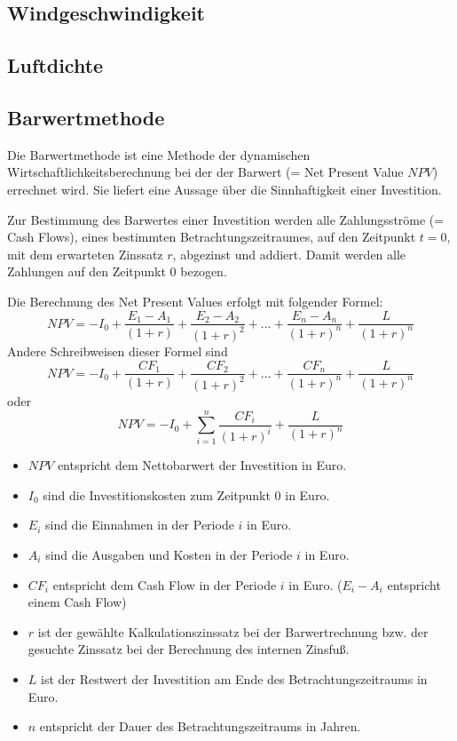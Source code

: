 \documentclass[a4paper,12pt]{article}
\begin{document}
	\subsection{Windgeschwindigkeit}
	\subsection{Luftdichte}
	\subsection{Barwertmethode}
	Die Barwertmethode ist eine Methode der dynamischen Wirtschaftlichkeitsberechnung bei der der Barwert (= Net Present Value $NPV$) errechnet wird. Sie liefert eine Aussage über die Sinnhaftigkeit einer Investition.\\ \par
	\noindent Zur Bestimmung des Barwertes einer Investition werden alle Zahlungsströme (= Cash Flows), eines bestimmten Betrachtungszeitraumes, auf den Zeitpunkt $t=0$, mit dem erwarteten Zinssatz $r$, abgezinst und addiert. Damit werden alle Zahlungen auf den Zeitpunkt $0$ bezogen.\\ \par
	\noindent Die Berechnung des Net Present Values erfolgt mit folgender Formel:
	\begin{equation}
	NPV=-I_0+\frac{E_1-A_1}{(1+r)}+\frac{E_2-A_2}{(1+r)^2}+...+\frac{E_n-A_n}{(1+r)^n}+\frac{L}{(1+r)^n}
	\end{equation}
	Andere Schreibweisen dieser Formel sind
	\begin{equation}
	NPV=-I_0+\frac{CF_1}{(1+r)}+\frac{CF_2}{(1+r)^2}+...+\frac{CF_n}{(1+r)^n}+\frac{L}{(1+r)^n}
	\end{equation}
	oder
	\begin{equation}
	NPV=-I_0+\sum_{i=1}^n\frac{CF_i}{(1+r)^i}+\frac{L}{(1+r)^n}
	\end{equation}
	\begin{itemize}
		\item $NPV$ entspricht dem Nettobarwert der Investition in Euro.
		\item $I_0$ sind die Investitionskosten zum Zeitpunkt $0$ in Euro.
		\item $E_i$ sind die Einnahmen in der Periode $i$ in Euro.
		\item $A_i$ sind die Ausgaben und Kosten in der Periode $i$ in Euro.
		\item $CF_i$ entspricht dem Cash Flow in der Periode $i$ in Euro. ($E_i-A_i$ entspricht einem Cash Flow)
		\item $r$ ist der gewählte Kalkulationszinssatz bei der Barwertrechnung bzw. der gesuchte Zinssatz bei der Berechnung des internen Zinsfuß.
		\item $L$ ist der Restwert der Investition am Ende des Betrachtungszeitraums in Euro.
		\item $n$ entspricht der Dauer des Betrachtungszeitraums in Jahren.
	\end{itemize}
\end{document}
